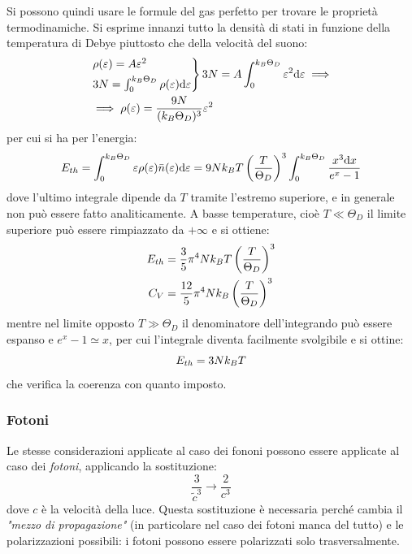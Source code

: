 Si possono quindi usare le formule del gas perfetto per trovare le proprietà termodinamiche. Si esprime innanzi tutto la densità di stati in funzione della temperatura di Debye piuttosto che della velocità del suono:
\begin{align*}
&\begin{rcases*}
\rho(\varepsilon) = A \varepsilon^2\\
3N = \int_0^{k_B \Theta_D} \rho(\varepsilon) \dd \varepsilon
\end{rcases*}
3N = A \int_0^{k_B \Theta_D} \varepsilon^2 \dd \varepsilon \implies\\
&\implies \rho(\varepsilon) = \frac{9N}{(k_B \Theta_D)^3}\varepsilon^2
\end{align*} 
per cui si ha per l'energia:
\begin{equation*}
E_{th} = \int_0^{k_B \Theta_D} \varepsilon \rho(\varepsilon) \bar{n}(\varepsilon)\dd \varepsilon = 9 N k_B T \left(\frac{T}{\Theta_D}\right)^3  \int_0^{k_B \Theta_D} \frac{x^3 \dd x}{e^x -1}
\end{equation*}
dove l'ultimo integrale dipende da $ T $ tramite l'estremo superiore, e in generale non può essere fatto analiticamente. A basse temperature, cioè $ T \ll \Theta_D $ il limite superiore può essere rimpiazzato da $ + \infty $ e si ottiene:
\begin{align*}
E_{th} &= \frac{3}{5} \pi^4 N k_B T \left(\frac{T}{\Theta_D}\right)^3\\
C_V &= \frac{12}{5} \pi^4 N k_B \left(\frac{T}{\Theta_D}\right)^3
\end{align*}
mentre nel limite opposto  $ T \gg \Theta_D $ il denominatore dell'integrando può essere espanso e $ e^x -1 \simeq x $, per cui l'integrale diventa facilmente svolgibile e si ottine:
\begin{equation*}
E_{th} = 3 N k_B T
\end{equation*}
che verifica la coerenza con quanto imposto.

\subsubsection{Fotoni}

Le stesse considerazioni applicate al caso dei fononi possono essere applicate al caso dei \textit{fotoni}, applicando la sostituzione:
\begin{equation*}
\frac{3}{\tilde{c}^3} \rightarrow \frac{2}{c^3}
\end{equation*}
dove $ c $ è la velocità della luce. Questa sostituzione è necessaria perché cambia il \textit{"mezzo di propagazione"} (in particolare nel caso dei fotoni manca del tutto) e le polarizzazioni possibili: i fotoni possono essere polarizzati solo trasversalmente.

